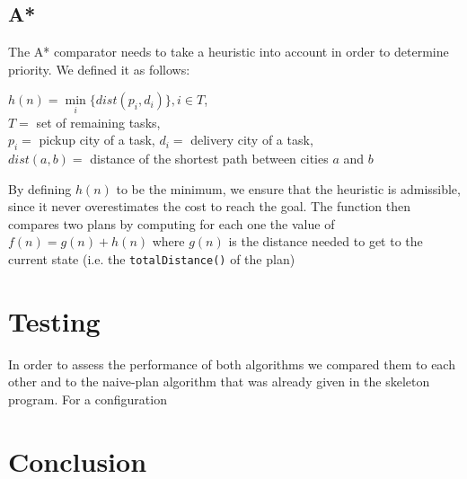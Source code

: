 \documentclass[12pt,a4paper]{article}
\begin{document}
\subsection*{A*}
The A* comparator needs to take a heuristic into account in order to determine priority. We defined it as follows: 
\begin{center}
$h(n) = \min\limits_{i}\lbrace dist(p_i, d_i)\rbrace, i \in T$, \\
$T = $ set of remaining tasks, \\
$p_i = $ pickup city of a task, $d_i = $ delivery city of a task, \\
$dist(a,b) = $ distance of the shortest path between cities $a$ and $b$
\end{center}
By defining $h(n)$ to be the minimum, we ensure that the heuristic is admissible, since it never overestimates the cost to reach the goal. The function then compares two plans by computing for each one the value of $f(n) = g(n) + h(n)$ where $g(n)$ is the distance needed to get to the current state (i.e. the \texttt{totalDistance()} of the plan)

\section{Testing}
In order to assess the performance of both algorithms we compared them to each other and to the naive-plan algorithm that was already given in the skeleton program. For a configuration 

\section{Conclusion}
\end{document}
